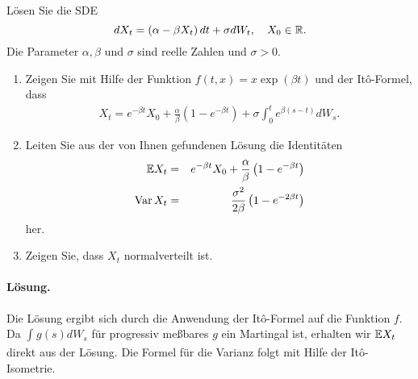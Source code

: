  Lösen Sie die \textsc{SDE}
\begin{equation}
    dX_t = \left( \alpha-\beta X_t \right)dt + \sigma dW_t, \quad X_0\in\mathbb{R}.
\end{equation}
Die Parameter $\alpha, \beta$ und $\sigma$ sind reelle Zahlen und $\sigma>0$. 
\begin{enumerate}
    \item Zeigen Sie mit Hilfe der Funktion $f(t,x)=x\exp(\beta t)$ und der It\^o-Formel, dass
        \begin{eqnarray}
            X_t = e^{-\beta t} X_0 + \frac{\alpha}{\beta}\left( 1-e^{-\beta t} \right)
                       + \sigma \int_{0}^{t} e^{\beta(s-t)} d W_s.
        \end{eqnarray}
    \item Leiten Sie aus der von Ihnen gefundenen Lösung die Identitäten
        \begin{eqnarray}
            \mathbb{E} X_t &=& e^{-\beta t} X_0 + \frac{\alpha}{\beta}\left( 1-e^{-\beta t} \right) \\
            \operatorname{Var} X_t &=& \frac{\sigma^2}{2\beta}\left( 1- e^{-2\beta t} \right)
        \end{eqnarray} 
        her.
    \item Zeigen Sie, dass $X_t$ normalverteilt ist. 
\end{enumerate}

\paragraph*{Lösung. } Die Lösung ergibt sich durch die Anwendung der It\^o-Formel
auf die Funktion $f$. Da $\int_{}^{} g(s) d W_s$ für progressiv meßbares $g$ ein
Martingal ist, erhalten wir $\mathbb{E} X_t$ direkt aus der Lösung. Die Formel für die 
Varianz folgt mit Hilfe der It\^o-Isometrie.


